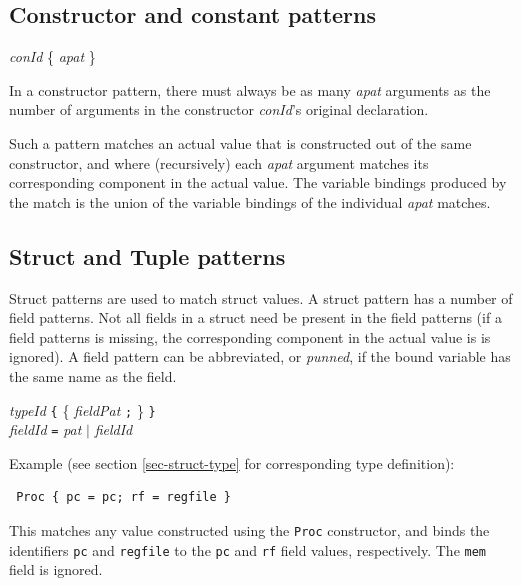 \documentclass[twoside,letterpaper]{article}
\newcommand{\hm}{\hspace*{1em}}
\newcommand{\te}[1]{\texttt{#1}}
\newcommand{\nterm}[1]{\emph{#1}}
\newcommand{\term}[1]{{\tt{#1}}}
\newcommand{\many}[1]{\{ #1 \}}
\newcommand{\alt}{{$\mid$}}
\newcommand{\gram}[2]{    \hm\makebox[10em][l]{\it #1}\makebox[1.5em][l]{::=}    #2}
\begin{document}

\subsection{Constructor and constant patterns}

\label{sec-patterns-constrs}


\gram{pat}{\nterm{conId} \many{\nterm{apat}}}

In a constructor pattern, there must always be as many {\nterm{apat}}
arguments as the number of arguments in the constructor
{\nterm{conId}}'s original declaration.

Such a pattern matches an actual value that is constructed out of the
same constructor, and where (recursively) each {\nterm{apat}} argument
matches its corresponding component in the actual value.  The variable
bindings produced by the match is the union of the variable bindings
of the individual {\nterm{apat}} matches.


\subsection{Struct and Tuple patterns}

\label{sec-patterns-struct}


Struct patterns are used to match struct values.  A struct pattern has
a number of field patterns.  Not all fields in a struct need be
present in the field patterns (if a field patterns is missing, the
corresponding component in the actual value is is ignored).  A field
pattern can be abbreviated, or {\emph{punned}}, if the bound variable
has the same name as the field.

\gram{apat}{\nterm{typeId} \term{\{} \many{\nterm{fieldPat} \term{;}} \term{\}}} \\
\gram{fieldPat}{ \nterm{fieldId} \term{=} \nterm{pat} {\alt} \nterm{fieldId} }

Example (see section {\ref{sec-struct-type}} for corresponding type definition):
\begin{verbatim}
 Proc { pc = pc; rf = regfile }
\end{verbatim}
This matches any value constructed using the {\te{Proc}} constructor,
and binds the identifiers {\te{pc}} and {\te{regfile}} to the {\te{pc}}
and {\te{rf}} field values, respectively.  The {\te{mem}} field is
ignored.
\end{document}
